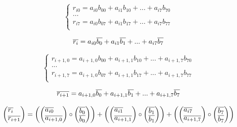 \documentclass[
11pt,%
tightenlines,%
twoside,%
onecolumn,%
nofloats,%
nobibnotes,%
nofootinbib,%
superscriptaddress,%
noshowpacs,%
centertags]%
{revtex4}
\begin{document}
\begin{equation}
\begin{cases}
r_{i0} = a_{i0}b_{00} + a_{i1}b_{10} + ... + a_{i7}b_{70} \\
... \\
r_{i7} = a_{i0}b_{07} + a_{i1}b_{17} + ... + a_{i7}b_{77} \\
\end{cases}
\end{equation}

\begin{equation}
\overline{r_i} = a_{i0}\overline{b_0} + a_{i1}\overline{b_1} + ... + a_{i7}\overline{b_7} \\
\end{equation}

\begin{equation}
\begin{cases}
r_{i+1,0} = a_{i+1,0}b_{00} + a_{i+1,1}b_{10} + ... + a_{i+1,7}b_{70} \\
... \\
r_{i+1,7} = a_{i+1,0}b_{07} + a_{i+1,1}b_{17} + ... + a_{i+1,7}b_{77} \\
\end{cases}
\end{equation}

\begin{equation}
\overline{r_{i+1}} = a_{i+1,0}\overline{b_0} + a_{i+1,1}\overline{b_1} + ... + a_{i+1,7}\overline{b_7} \\
\end{equation}

\begin{equation}
\left(\vcenter{\hbox{$\overline{r_i}$}\hbox{$\overline{r_{i+1}}$}}\right) =
\left(
\left(\vcenter{\hbox{$\overline{a_{i0}}$}\hbox{$\overline{a_{i+1,0}}$}}\right) \circ
\left(\vcenter{\hbox{$\overline{b_0}$}\hbox{$\overline{b_0}$}}\right)
\right) +
\left(
\left(\vcenter{\hbox{$\overline{a_{i1}}$}\hbox{$\overline{a_{i+1,1}}$}}\right) \circ
\left(\vcenter{\hbox{$\overline{b_1}$}\hbox{$\overline{b_1}$}}\right)
\right) +
\left(
\left(\vcenter{\hbox{$\overline{a_{i7}}$}\hbox{$\overline{a_{i+1,7}}$}}\right) \circ
\left(\vcenter{\hbox{$\overline{b_7}$}\hbox{$\overline{b_7}$}}\right)
\right)
\end{equation}
\end{document}
